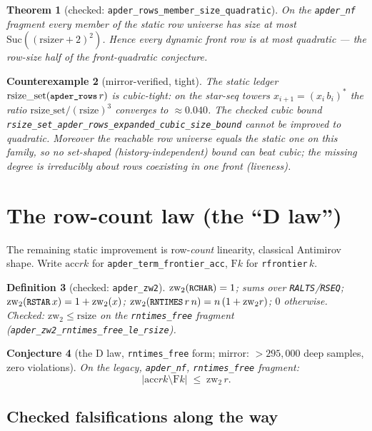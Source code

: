 \documentclass[11pt]{article}
\newtheorem{theorem}{Theorem}[section]
\newtheorem{conjecture}[theorem]{Conjecture}
\newtheorem{counterexample}[theorem]{Counterexample}
\newtheorem{definition}[theorem]{Definition}
\newcommand{\rsize}{\mathrm{rsize}}
\newcommand{\rsizeset}{\mathrm{rsize\_set}}
\newcommand{\acc}{\mathrm{acc}}
\newcommand{\F}{\mathrm{F}}
\newcommand{\zw}{\mathrm{zw}}
\newcommand{\code}[1]{\texttt{\small #1}}
\begin{document}
\begin{theorem}[checked: \code{apder\_rows\_member\_size\_quadratic}]
On the \code{apder\_nf} fragment every member of the static row universe has
size at most $\mathrm{Suc}((\rsize r + 2)^2)$.  Hence every dynamic front row
is at most quadratic --- the row-size half of the front-quadratic conjecture.
\end{theorem}

\begin{counterexample}[mirror-verified, tight]
The static ledger $\rsizeset(\code{apder\_rows}\,r)$ is \emph{cubic-tight}:
on the star-seq towers $x_{i+1} = (x_i\, b_i)^{*}$ the ratio
$\rsizeset/(\rsize)^3$ converges to $\approx 0.040$.  The checked cubic bound
\code{rsize\_set\_apder\_rows\_expanded\_cubic\_size\_bound} cannot be
improved to quadratic.  Moreover the \emph{reachable} row universe equals the
static one on this family, so no set-shaped (history-independent) bound can
beat cubic; the missing degree is irreducibly about rows \emph{coexisting} in
one front (liveness).
\end{counterexample}

\section{The row-count law (the ``D law'')}

The remaining static improvement is row-\emph{count} linearity, classical
Antimirov shape.  Write $\acc r k$ for
\code{apder\_term\_frontier\_acc}, $\F k$ for \code{rfrontier}\,$k$.

\begin{definition}[checked: \code{apder\_zw2}]
$\zw_2(\code{RCHAR}) = 1$; sums over \code{RALTS}/\code{RSEQ};
$\zw_2(\code{RSTAR}\,x) = 1 + \zw_2(x)$;
$\zw_2(\code{RNTIMES}\,r\,n) = n\,(1+\zw_2 r)$; $0$ otherwise.
Checked: $\zw_2 \le \rsize$ on the \code{rntimes\_free} fragment
(\code{apder\_zw2\_rntimes\_free\_le\_rsize}).
\end{definition}

\begin{conjecture}[the D law, \code{rntimes\_free} form; mirror: $>295{,}000$ deep samples, zero violations]
\label{conj:dlaw}
On the legacy, \code{apder\_nf}, \code{rntimes\_free} fragment:
\[
|\acc r k \setminus \F k| \;\le\; \zw_2\, r .
\]
\end{conjecture}

\subsection{Checked falsifications along the way}
\end{document}
